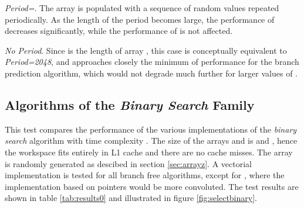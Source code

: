 \documentclass[preprint,1p,times]{elsarticle}
\begin{document}
\textit{Period=}. The array  is populated with a sequence of  random values repeated periodically. As the length of the period  becomes large, the performance of \textit{\ClassicName} decreases significantly, while the performance of \textit{\ClassicModName} is not affected.

\textit{No Period}. Since  is the length of array , this case is conceptually equivalent to \textit{Period=2048}, and approaches closely the minimum of performance for the branch prediction algorithm, which would not degrade much further for larger values of .

\subsection{Algorithms of the \textit{Binary Search} Family}
\label{sec:testbinalg}
This test compares the performance of the various implementations of the \textit{binary search} algorithm with time complexity .
The size of the arrays  and  is  and , hence the workspace fits entirely in L1 cache and there are no cache misses.
The array  is randomly generated as descibed in section \ref{sec:arrayz}.
A vectorial implementation is tested for all branch free algorithms, except for \textit{\MorinOffsetName}, where the implementation based on pointers would be more convoluted.
The test results are shown in table \ref{tab:results0} and illustrated in figure \ref{fig:selectbinary}.
\end{document}
